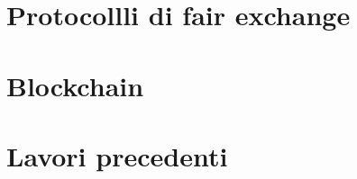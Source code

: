 \section{Protocollli di fair exchange}

%
%

\section{Blockchain}

%
%




\section{Lavori precedenti}







